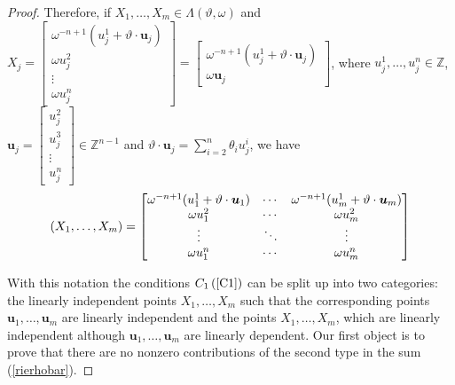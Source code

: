 \documentclass[11pt]{article}
\theoremstyle{definition}
\theoremstyle{proof}
\begin{document}
\begin{proof}
    Therefore, if $X_1, \ldots , X_m \in \Lambda (\vartheta , \omega )$ and $X_j = 
    \begin{bmatrix}
        \omega ^{-n+1} (u_j^1 + \vartheta \cdot \bm{u}_j) \\
        \omega u_j^2 \\
        \vdots \\
        \omega u_j^n
    \end{bmatrix} = 
    \begin{bmatrix}
        \omega ^{-n+1} (u_j^1 + \vartheta \cdot \bm{u}_j) \\
        \omega \bm{u}_j 
    \end{bmatrix}
    $, where $u_j^1, \ldots , u_j^n \in \mathbb{Z}$, $\bm{u}_j =
    \begin{bmatrix}
        u_j^2 \\
        u_j^3 \\
        \vdots \\
        u_j^n
    \end{bmatrix}
    \in \mathbb{Z}^{n-1}$ and $\vartheta \cdot \bm{u}_j = \displaystyle\sum_{i=2}^{n} \theta _i u_j^i$, we have
    \begin{equation}\label{xs}
        (X_1, \ldots, X_m) = 
        \renewcommand\arraystretch{1}
        \begin{bmatrix}
            \omega ^{-n+1}(u^1_1 + \vartheta \cdot \bm{u}_1) & \cdots  & \omega ^{-n+1} ( u^1_m+ \vartheta \cdot \bm{u}_m) \\
            \omega u^2_1                                     & \cdots  & \omega u^2_m \\
            \vdots                                           & \ddots  & \vdots \\
            \omega u^n_1                                     & \cdots  & \omega u^n_m
        \end{bmatrix}
    \end{equation}

    With this notation the conditions $C_1 \, (\ref{C1})$ can be split up into two categories: the linearly independent points $X_1, \ldots , X_m$ such that the corresponding points $\bm{u}_1, \ldots, \bm{u}_m$ are linearly independent and the points $X_1, \ldots, X_m$, which are linearly independent although $\bm{u}_1, \ldots, \bm{u}_m$ are linearly dependent.
    Our first object is to prove that there are  no nonzero contributions of the second type in the sum (\ref{rierhobar}).


\end{proof}
\end{document}
